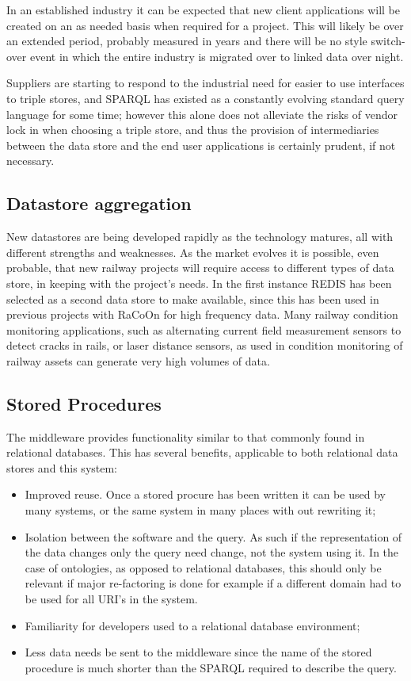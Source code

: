 In an established industry it can be expected that new client applications will be created on an as needed basis when required for a project. This will likely be over an extended period, probably measured in years and there will be no  style switch-over event in which the entire industry is migrated over to linked data over night. 

Suppliers are starting to respond to the industrial need for easier to use interfaces to triple stores, and SPARQL has existed as a constantly evolving standard query language for some time; however this alone does not alleviate the risks of vendor lock in when choosing a triple store, and thus the provision of intermediaries between the data store and the end user applications is certainly prudent, if not necessary.

\subsection{Datastore aggregation}
New datastores are being developed rapidly as the technology matures, all with different strengths and weaknesses. As the market evolves it is possible, even probable, that new railway projects will require access to different types of data store, in keeping with the project's needs. In the first instance REDIS has been selected as a second data store to make available, since this has been used in previous projects with RaCoOn for high frequency data. Many railway condition monitoring applications, such as alternating current field measurement sensors to detect cracks in rails, or laser distance sensors, as used in condition monitoring of railway assets can generate very high volumes of data.
\subsection{Stored Procedures}
The middleware provides  functionality similar to that commonly found in relational databases. This has several benefits, applicable to both relational data stores and this system:

\begin{itemize}
    \item Improved reuse. Once a stored procure has been written it can be used by many systems, or the same system in many places with out rewriting it;
   \item Isolation between the software and the query. As such if the representation of the data changes only the query need change, not the system using it. In the case of ontologies, as opposed to relational databases, this should only be relevant if major re-factoring is done for example if a different domain had to be used for all URI's in the system.
    \item Familiarity for developers used to a relational database environment;    
    \item Less data needs be sent to the middleware since the name of the stored procedure is much shorter than the SPARQL required to describe the query. 
\end{itemize}

